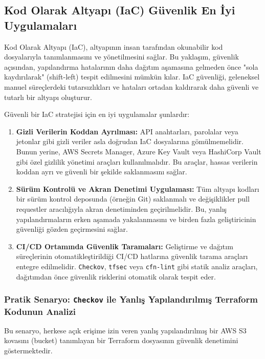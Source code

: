 \subsection{Kod Olarak Altyapı (IaC) Güvenlik En İyi Uygulamaları}

Kod Olarak Altyapı (IaC), altyapının insan tarafından okunabilir kod dosyalarıyla tanımlanmasını ve yönetilmesini sağlar. Bu yaklaşım, güvenlik açısından, yapılandırma hatalarının daha dağıtım aşamasına gelmeden önce "sola kaydırılarak" (shift-left) tespit edilmesini mümkün kılar. IaC güvenliği, geleneksel manuel süreçlerdeki tutarsızlıkları ve hataları ortadan kaldırarak daha güvenli ve tutarlı bir altyapı oluşturur.


Güvenli bir IaC stratejisi için en iyi uygulamalar şunlardır:

\begin{enumerate}
    \item \textbf{Gizli Verilerin Koddan Ayrılması:} API anahtarları, parolalar veya jetonlar gibi gizli veriler asla doğrudan IaC dosyalarına gömülmemelidir. Bunun yerine, AWS Secrets Manager, Azure Key Vault veya HashiCorp Vault gibi özel gizlilik yönetimi araçları kullanılmalıdır. Bu araçlar, hassas verilerin koddan ayrı ve güvenli bir şekilde saklanmasını sağlar.
    \item \textbf{Sürüm Kontrolü ve Akran Denetimi Uygulaması:} Tüm altyapı kodları bir sürüm kontrol deposunda (örneğin Git) saklanmalı ve değişiklikler pull requestler aracılığıyla akran denetiminden geçirilmelidir. Bu, yanlış yapılandırmaların erken aşamada yakalanmasını ve birden fazla geliştiricinin güvenliği gözden geçirmesini sağlar.
    \item \textbf{CI/CD Ortamında Güvenlik Taramaları:} Geliştirme ve dağıtım süreçlerinin otomatikleştirildiği CI/CD hatlarına güvenlik tarama araçları entegre edilmelidir. \texttt{Checkov}, \texttt{tfsec} veya \texttt{cfn-lint} gibi statik analiz araçları, dağıtımdan önce güvenlik risklerini otomatik olarak tespit eder.
\end{enumerate}

\subsubsection*{Pratik Senaryo: \texttt{Checkov} ile Yanlış Yapılandırılmış Terraform Kodunun Analizi}

Bu senaryo, herkese açık erişime izin veren yanlış yapılandırılmış bir AWS S3 kovasını (bucket) tanımlayan bir Terraform dosyasının güvenlik denetimini göstermektedir.

